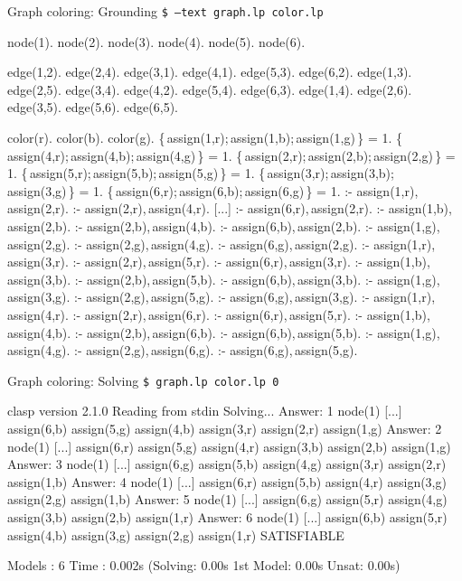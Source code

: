 \begin{frame}[fragile,shrink=1]{Graph coloring: Grounding}
%
\mbox{\Large\texttt{\$  --text graph.lp color.lp }}
\pause
\begin{semiverbatim}
node(1).  node(2).  node(3).  node(4).  node(5).  node(6).

edge(1,2).  edge(2,4).  edge(3,1).  edge(4,1).  edge(5,3).  edge(6,2).
edge(1,3).  edge(2,5).  edge(3,4).  edge(4,2).  edge(5,4).  edge(6,3).
edge(1,4).  edge(2,6).  edge(3,5).              edge(5,6).  edge(6,5).

color(r).  color(b).  color(g).
\pause
\{\,assign(1,r);\,assign(1,b);\,assign(1,g)\,\} = 1. \{\,assign(4,r);\,assign(4,b);\,assign(4,g)\,\} = 1.
\{\,assign(2,r);\,assign(2,b);\,assign(2,g)\,\} = 1. \{\,assign(5,r);\,assign(5,b);\,assign(5,g)\,\} = 1.
\{\,assign(3,r);\,assign(3,b);\,assign(3,g)\,\} = 1. \{\,assign(6,r);\,assign(6,b);\,assign(6,g)\,\} = 1.
\pause
:- assign(1,r),\,assign(2,r).  :- assign(2,r),\,assign(4,r). [...] :- assign(6,r),\,assign(2,r).
:- assign(1,b),\,assign(2,b).  :- assign(2,b),\,assign(4,b).       :- assign(6,b),\,assign(2,b).
:- assign(1,g),\,assign(2,g).  :- assign(2,g),\,assign(4,g).       :- assign(6,g),\,assign(2,g).
:- assign(1,r),\,assign(3,r).  :- assign(2,r),\,assign(5,r).       :- assign(6,r),\,assign(3,r).
:- assign(1,b),\,assign(3,b).  :- assign(2,b),\,assign(5,b).       :- assign(6,b),\,assign(3,b).
:- assign(1,g),\,assign(3,g).  :- assign(2,g),\,assign(5,g).       :- assign(6,g),\,assign(3,g).
:- assign(1,r),\,assign(4,r).  :- assign(2,r),\,assign(6,r).       :- assign(6,r),\,assign(5,r).
:- assign(1,b),\,assign(4,b).  :- assign(2,b),\,assign(6,b).       :- assign(6,b),\,assign(5,b).
:- assign(1,g),\,assign(4,g).  :- assign(2,g),\,assign(6,g).       :- assign(6,g),\,assign(5,g).
\end{semiverbatim}
\end{frame}

\begin{frame}[fragile,shrink=1]{Graph coloring: Solving}
%
\mbox{\Large\texttt{\$  graph.lp color.lp 0}}
\pause
\begin{semiverbatim}
clasp version 2.1.0
Reading from stdin
Solving...
Answer: 1
node(1) [...] \alert{assign(6,b) assign(5,g) assign(4,b) assign(3,r) assign(2,r) assign(1,g)}
Answer: 2
node(1) [...] \alert{assign(6,r) assign(5,g) assign(4,r) assign(3,b) assign(2,b) assign(1,g)}
Answer: 3
node(1) [...] \alert{assign(6,g) assign(5,b) assign(4,g) assign(3,r) assign(2,r) assign(1,b)}
Answer: 4
node(1) [...] \alert{assign(6,r) assign(5,b) assign(4,r) assign(3,g) assign(2,g) assign(1,b)}
Answer: 5
node(1) [...] \alert{assign(6,g) assign(5,r) assign(4,g) assign(3,b) assign(2,b) assign(1,r)}
Answer: 6
node(1) [...] \alert{assign(6,b) assign(5,r) assign(4,b) assign(3,g) assign(2,g) assign(1,r)}
SATISFIABLE

Models      : 6
Time        : 0.002s (Solving: 0.00s 1st Model: 0.00s Unsat: 0.00s)

\end{semiverbatim}
\end{frame}
